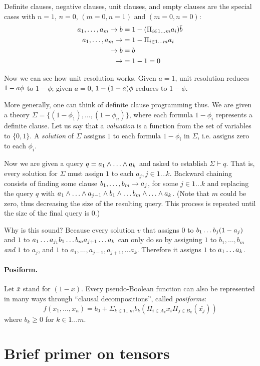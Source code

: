 \documentclass{article} %
\begin{document}
Definite clauses, negative clauses, unit clauses, and empty clauses are the special cases with 
$n=1$, $n=0$, $(m=0,n=1)$ and $(m=0,n=0)$: 
  \begin{align*}
    a_1,\ldots, a_m \rightarrow b &= 1-{(\Pi_{i \in 1\ldots m} a_i)  \bar{b}}\\
    a_1,\ldots, a_m \rightarrow &= 1-{\Pi_{i \in 1\ldots m} a_i}\\
    \rightarrow b &= b\\
    \rightarrow &= 1 - 1 = 0
  \end{align*}

Now we can see how unit resolution works.  Given $a=1$, unit resolution reduces $1-a\phi$ to $1-\phi$; given $a=0$, $1- (1-a) \phi$ reduces to $1-\phi$. 

More generally, one can think of definite clause programming thus. We are given a theory $\Sigma=\{(1-\phi_1),\ldots, (1-\phi_n)\}$, where each formula $1-\phi_i$ represents a definite clause.  
Let us say that a {\em valuation} is a function from the set of variables to $\{0,1\}$. A {\em solution} of $\Sigma$ assigns $1$ to each formula $1-\phi_i$ in $\Sigma$, i.e.{} assigns zero to each $\phi_i$. 

Now we are given a query $q=a_1 \wedge \ldots \wedge a_k$ and asked to establish $\Sigma \vdash q$. That is, every solution for $\Sigma$ must assign $1$ to each $a_j, j\in 1\ldots k$. Backward chaining consists of finding some clause $b_1,\ldots, b_m\rightarrow a_j$, for some $j\in 1\ldots k$ and replacing the query $q$ with $a_1\wedge \ldots \wedge a_{j-1} \wedge b_1 \wedge \ldots b_m \wedge \ldots \wedge a_k$. (Note that $m$ could be zero, thus decreasing the size of the resulting query. This process is repeated until the size of the final query is $0$.)

Why is this sound? Because every solution $v$ that assigns $0$ to $b_1 \ldots  b_j (1-a_j)$ and $1$ to 
$a_1 \ldots  a_{j_1} b_1  \ldots  b_m  a_{j+1} \ldots  a_k$ can only do so by 
assigning $1$ to $b_1, \ldots, b_m$ {\em and} $1$ to $a_j$, and $1$ to $a_1,\ldots, a_{j-1},a_{j+1},\ldots a_k$. Therefore it assigns $1$ to $a_1  \ldots  a_k$. 

\paragraph{Posiform.}
Let $\bar{x}$ stand for $(1-x)$. Every pseudo-Boolean function can also be represented in many ways through ``clausal decompositions'', called {\em posiforms}:
\begin{equation}
  f(x_1,\ldots, x_n)=b_0 + \Sigma_{k \in 1\ldots m} b_k (\Pi_{i\in A_k} x_i \Pi_{j\in B_k}(\bar{x_j}))
\end{equation}
\noindent where $b_k\geq 0$ for $k \in 1\ldots m$. 

\section{Brief primer on tensors}
\end{document}
